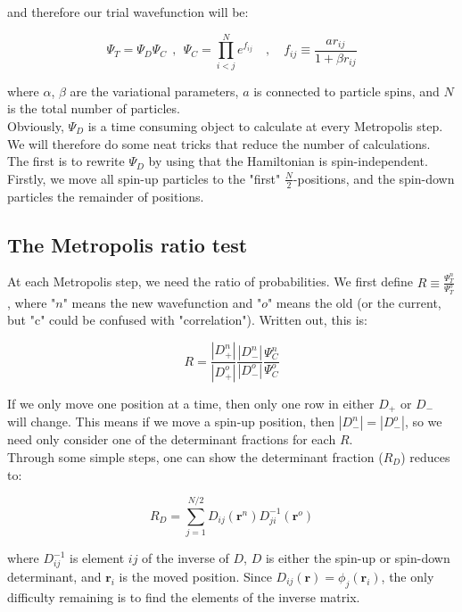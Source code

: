 \documentclass[english, a4paper]{article}
\newcommand{\bm}[1]{\mathbf{#1}}
\begin{document}
and therefore our trial wavefunction will be:

\begin{equation}
	\Psi_T = \Psi_{D}\Psi_{C} \:\:,\:\: \Psi_{C} = \prod_{i<j}^N e^{f_{ij}}\quad,\quad f_{ij} \equiv\frac{ar_{ij}}{1+\beta r_{ij}}
\end{equation}

where $\alpha$, $\beta$ are the variational parameters, $a$ is connected to particle spins, and $N$ is the total number of particles.\\
Obviously, $\Psi_{D}$ is a time consuming object to calculate at every Metropolis step. We will therefore do some neat tricks that reduce the number of calculations.\\
The first is to rewrite $\Psi_D$ by using that the Hamiltonian is spin-independent. Firstly, we move all spin-up particles to the "first" $\frac{N}{2}$-positions, and the spin-down particles the remainder of positions. \\

\subsection{The Metropolis ratio test}
At each Metropolis step, we need the ratio of probabilities. We first define $R\equiv\frac{\Psi_T^n}{\Psi_T^o}$, where "$n$" means the new wavefunction and "$o$" means the old (or the current, but "c" could be confused with "correlation"). Written out, this is:

\begin{equation}
	R = \frac{|D_+^n|}{|D_+^o|}\frac{|D_-^n|}{|D_-^o|}\frac{\Psi_C^n}{\Psi_C^o}
\end{equation}

If we only move one position at a time, then only one row in either $D_+$ or $D_-$ will change. This means if we move a spin-up position, then $|D_-^n| = |D_-^o|$, so we need only consider one of the determinant fractions for each $R$.\\
Through some simple steps, one can show the determinant fraction ($R_{D}$) reduces to:

\begin{equation}
	R_D = \sum_{j=1}^{N/2} D_{ij}(\bm{r}^n)D_{ji}^{-1}(\bm{r}^o)
\end{equation}

where $D_{ij}^{-1}$ is element $ij$ of the inverse of $D$, $D$ is either the spin-up or spin-down determinant, and $\bm{r}_i$ is the moved position. Since $D_{ij}(\bm{r}) = \phi_j(\bm{r}_i)$, the only difficulty remaining is to find the elements of the inverse matrix.\\
\end{document}
